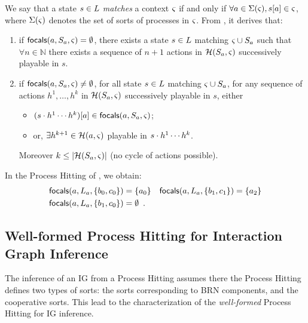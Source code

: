 We say that a state $s\in L$ \emph{matches} a context $\varsigma$ if and only if
$\forall a\in\Sigma(\varsigma), {s[a]}\in\varsigma$, where $\Sigma(\varsigma)$ denotes the set of sorts of
processes in $\varsigma$.
From , it derives that:
\begin{enumerate}
\item if $\mathsf{focals}(a,S_a,\varsigma)=\emptyset$, there exists a 
state $s\in L$ matching $\varsigma\cup S_a$ such that $\forall n\in\mathbb N$ there
exists a sequence of $n+1$ actions in $\mathcal{H}(S_a,\varsigma)$ successively playable in $s$.
\item if $\mathsf{focals}(a,S_a,\varsigma)\neq\emptyset$, for all
state $s\in L$ matching $\varsigma\cup S_a$,
for any sequence of actions $h^1,\dots,h^k$ in $\mathcal{H}(S_a,\varsigma)$ successively playable in $s$,
either
\begin{itemize}
\item $(s\cdot h^1\cdots h^k)[a] \in \mathsf{focals}(a,S_a,\varsigma)$;
\item or, $\exists h^{k+1}\in \mathcal{H}(a,\varsigma)$ playable in $s\cdot h^1\cdots h^k$.
\end{itemize}
Moreover $k\leq|\mathcal{H}(S_a,\varsigma)|$ (no cycle of actions possible).
\end{enumerate}


\begin{example*}
In the Process Hitting of , we obtain:
\begin{align*}
\mathsf{focals}(a,L_a,\{b_0,c_0\}) &= \{ a_0 \}
&
\mathsf{focals}(a,L_a,\{b_1,c_1\}) &= \{ a_2 \}\\
\mathsf{focals}(a,L_a,\{b_1,c_0\}) &= \emptyset\enspace.
\end{align*}
\end{example*}

\subsection{Well-formed Process Hitting for Interaction Graph Inference}

The inference of an IG from a Process Hitting assumes there the Process Hitting defines two types of
sorts:
the sorts corresponding to BRN components, and the cooperative sorts.
This lead to the characterization of the \emph{well-formed} Process Hitting for IG inference.


